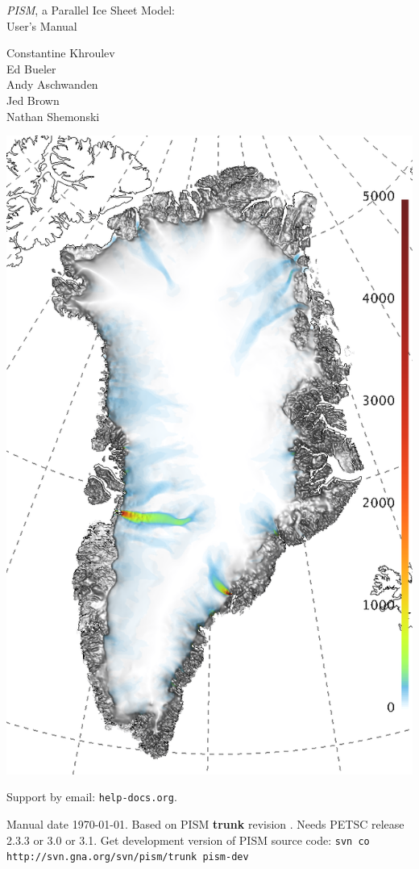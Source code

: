 \documentclass[titlepage,letterpaper,final]{scrartcl}
\newcommand{\PISMREV}{\textbf{trunk} revision }
\newcommand{\PETSCREL}{2.3.3 or 3.0 or 3.1}
\newcommand{\PISMDOWNLOADMSG}{Get development version of PISM source code: \quad\texttt{svn co http://svn.gna.org/svn/pism/trunk pism-dev} \quad}
\begin{document}
\graphicspath{{figs/}}

\begin{titlepage}
  \begin{center}
    {\huge{} \emph{PISM}, a Parallel Ice Sheet Model:\\\medskip User's Manual}
    \vspace{1cm}

    {\Large Constantine Khroulev \\ Ed Bueler \\ Andy Aschwanden \\ Jed Brown \\ Nathan Shemonski}
    \vspace{1cm}

    \includegraphics[width=3.in,keepaspectratio=true]{grn-grl-csurf}
    \vfill

    \small Support by email: \texttt{help\@@pism-docs.org}. 

    Manual date \today. Based on PISM \PISMREV.  Needs PETSC release \PETSCREL. \PISMDOWNLOADMSG
  \end{center}
\end{titlepage}
\end{document}
